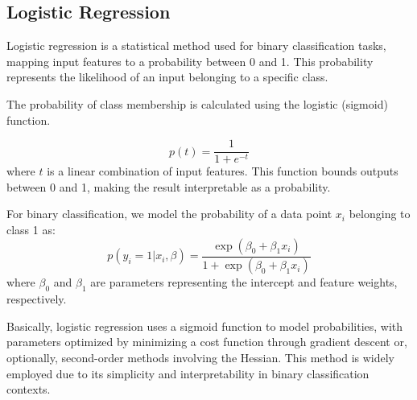 



\subsection{Logistic Regression}


Logistic regression is a statistical method used for binary classification tasks, mapping input features to a probability between 0 and 1. This probability represents the likelihood of an input belonging to a specific class.

The probability of class membership is calculated using the logistic (sigmoid) function.

\begin{equation}
      p(t) = \frac{1}{1 + e^{-t}}
\end{equation}
where \( t \) is a linear combination of input features. This function bounds outputs between 0 and 1, making the result interpretable as a probability.

For binary classification, we model the probability of a data point \( x_i \) belonging to class 1 as:
   \[
   p(y_i = 1 | x_i, \beta) = \frac{\exp(\beta_0 + \beta_1 x_i)}{1 + \exp(\beta_0 + \beta_1 x_i)}
   \]
where \( \beta_0 \) and \( \beta_1 \) are parameters representing the intercept and feature weights, respectively.


Basically, logistic regression uses a sigmoid function to model probabilities, with parameters optimized by minimizing a cost function through gradient descent or, optionally, second-order methods involving the Hessian. This method is widely employed due to its simplicity and interpretability in binary classification contexts.





  
